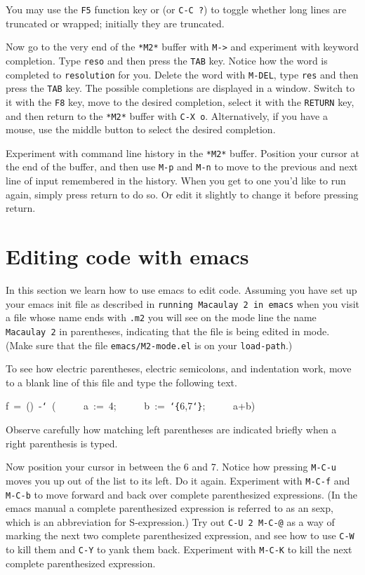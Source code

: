 You may use the {\tt {}F5} function key or (or {\tt {}C-C\ ?}) to 
toggle whether long lines are truncated or wrapped; initially they are truncated.

Now go to the very end of the {\tt {}*M2*} buffer with {\tt {}M->} and 
experiment with keyword completion.  Type {\tt {}reso} and then press the 
{\tt {}TAB} key.  Notice how the word is completed to {\tt {}resolution}
for you.  Delete the word with {\tt {}M-DEL}, type {\tt {}res}
and then press the {\tt {}TAB} key.  The possible completions are displayed 
in a window.  Switch to it with the {\tt {}F8} key, move to the desired 
completion, select it with the {\tt {}RETURN} key, and then return to the 
{\tt {}*M2*} buffer with {\tt {}C-X\ o}.  Alternatively, if you have a
mouse, use the middle button to select the desired completion.

Experiment with command line history in the {\tt {}*M2*} buffer.  Position 
your cursor at the end of the buffer, and then use {\tt {}M-p} and {\tt {}M-n} 
to move to the previous and next line of input remembered in the history.  When you 
get to one you'd like to run again, simply press return to do so.  Or edit it
slightly to change it before pressing return.

\section{Editing \Mtwo code with emacs}

In this section we learn how to use emacs to edit \Mtwo code.  Assuming you
have set up your emacs init file as described in {\tt {}running\ Macaulay\ 2\ in\ emacs}
when you visit a file whose name ends with {\tt {}.m2} 
you will see on the mode line the name {\tt {}Macaulay\ 2} in
parentheses, indicating that the file is being edited in \Mtwo mode.  (Make
sure that the file {\tt {}emacs/M2-mode.el} is on your {\tt {}load-path}.)

To see how electric parentheses, electric semicolons, and indentation work,
move to a blank line of this file and type the following text.

\smallskip

{\ttfamily\obeylines
f~=~()~-{\tt\char`\>}~(
~~~~~a~:=~4;
~~~~~b~:=~{\tt\char`\{}6,7{\tt\char`\}};
~~~~~a+b)
}

\smallskip

Observe carefully how matching left parentheses are indicated briefly when a
right parenthesis is typed.

Now position your cursor in between the 6 and 7.  Notice how
pressing {\tt {}M-C-u} moves you up out of the list to its left.  Do it 
again.  Experiment with {\tt {}M-C-f} and {\tt {}M-C-b} to move forward
and back over complete parenthesized
expressions.  (In the emacs manual a complete parenthesized expression is
referred to as an sexp, which is an abbreviation for S-expression.)  Try out
{\tt {}C-U\ 2\ M-C-@} as a way of marking the next two complete parenthesized
expression, and see how to use {\tt {}C-W} to kill them and {\tt {}C-Y} to yank 
them back.  Experiment with {\tt {}M-C-K} to kill the next complete parenthesized 
expression.

